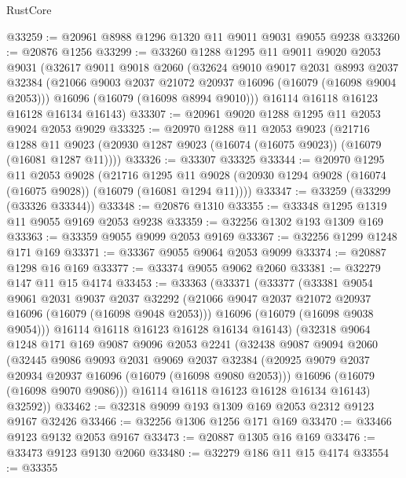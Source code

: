 \begin{lexlean}{RustCore}
\begin{coremodule}
@33259 := @20961 @8988 @1296 @1320 @11 @9011 @9031 @9055 @9238
@33260 := @20876 @1256
@33299 := @33260
    @1288
    @1295
    @11
    @9011
    @9020
    @2053
    @9031
    (@32617
      @9011
      @9018
      @2060
      (@32624
        @9010
        @9017
        @2031
        @8993
        @2037
        @32384
        (@21066 @9003 @2037 @21072 @20937 @16096 (@16079 (@16098 @9004 @2053)))
        @16096
        (@16079 (@16098 @8994 @9010)))
      @16114
      @16118
      @16123
      @16128
      @16134
      @16143)
@33307 := @20961 @9020 @1288 @1295 @11 @2053 @9024 @2053 @9029
@33325 := @20970
    @1288
    @11
    @2053
    @9023
    (@21716
      @1288
      @11
      @9023
      (@20930 @1287 @9023 (@16074 (@16075 @9023)) (@16079 (@16081 @1287 @11))))
@33326 := @33307 @33325
@33344 := @20970
    @1295
    @11
    @2053
    @9028
    (@21716
      @1295
      @11
      @9028
      (@20930 @1294 @9028 (@16074 (@16075 @9028)) (@16079 (@16081 @1294 @11))))
@33347 := @33259 (@33299 (@33326 @33344))
@33348 := @20876 @1310
@33355 := @33348 @1295 @1319 @11 @9055 @9169 @2053 @9238
@33359 := @32256 @1302 @193 @1309 @169
@33363 := @33359 @9055 @9099 @2053 @9169
@33367 := @32256 @1299 @1248 @171 @169
@33371 := @33367 @9055 @9064 @2053 @9099
@33374 := @20887 @1298 @16 @169
@33377 := @33374 @9055 @9062 @2060
@33381 := @32279 @147 @11 @15 @4174
@33453 := @33363
    (@33371
      (@33377
        (@33381
          @9054
          @9061
          @2031
          @9037
          @2037
          @32292
          (@21066 @9047 @2037 @21072 @20937 @16096 (@16079 (@16098 @9048 @2053)))
          @16096
          (@16079 (@16098 @9038 @9054)))
        @16114
        @16118
        @16123
        @16128
        @16134
        @16143)
      (@32318
        @9064
        @1248
        @171
        @169
        @9087
        @9096
        @2053
        @2241
        (@32438
          @9087
          @9094
          @2060
          (@32445
            @9086
            @9093
            @2031
            @9069
            @2037
            @32384
            (@20925 @9079 @2037 @20934 @20937 @16096 (@16079 (@16098 @9080 @2053)))
            @16096
            (@16079 (@16098 @9070 @9086)))
          @16114
          @16118
          @16123
          @16128
          @16134
          @16143)
        @32592))
@33462 := @32318 @9099 @193 @1309 @169 @2053 @2312 @9123 @9167 @32426
@33466 := @32256 @1306 @1256 @171 @169
@33470 := @33466 @9123 @9132 @2053 @9167
@33473 := @20887 @1305 @16 @169
@33476 := @33473 @9123 @9130 @2060
@33480 := @32279 @186 @11 @15 @4174
@33554 := @33355

\end{coremodule}
\end{lexlean}
